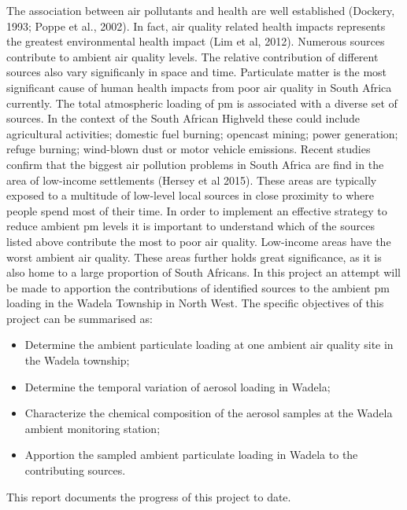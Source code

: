 \documentclass{nwureport}
\begin{document}
The association between air pollutants and health are well established (Dockery, 1993; Poppe et al., 2002). In fact, air quality related health impacts represents the greatest environmental health impact (Lim et al, 2012). Numerous sources contribute to ambient air quality levels. The relative contribution of different sources also vary significanly in space and time. Particulate matter is the most significant cause of human health impacts from poor air quality in South Africa currently. The total atmospheric loading of \gls{pm} is associated with a diverse set of sources. In the context of the South African Highveld these could include agricultural activities; domestic fuel burning; opencast mining; power generation; refuge burning; wind-blown dust or motor vehicle emissions. Recent studies confirm that the biggest air pollution problems in South Africa are find in the area of low-income settlements (Hersey et al 2015). These areas are typically exposed to a multitude of low-level local sources in close proximity to where people spend most of their time. In order to implement an effective strategy to reduce ambient \gls{pm} levels it is important to understand which of the sources listed above contribute the most to poor air quality. Low-income areas have the worst ambient air quality. These areas further holds great significance, as it is also home to a large proportion of South Africans. In this project an attempt will be made to apportion the contributions of identified sources to the ambient \gls{pm} loading in the Wadela Township in North West. The specific objectives of this project can be summarised as:

\begin{itemize}
\item Determine the ambient particulate loading at one ambient air quality site in the Wadela township;
\item Determine the temporal variation of aerosol loading in Wadela;
\item Characterize the chemical composition of the aerosol samples at the Wadela ambient monitoring station;
\item Apportion the sampled ambient particulate loading in Wadela to the contributing sources.
\end{itemize}

This report documents the progress of this project to date.
\end{document}

